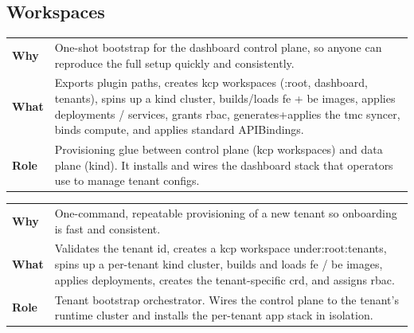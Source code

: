 \documentclass[11pt, a4paper, oneside, listof=totoc]{scrartcl}
\makeatletter
\newcommand{\codesummary}[3]{%
    \vspace{0.4\baselineskip}%
    \noindent\begin{tabularx}{\linewidth}{@{}>{\bfseries}l X@{}}
    Why  & #1\\
    What & #2\\
    Role & #3\\
    \end{tabularx}%
    \vspace{0.2\baselineskip}%
}
\makeatother
\begin{document}
        \clearpage

            \subsection{Workspaces}
                \codesummary
                    {One-shot bootstrap for the dashboard control plane, so anyone can reproduce the full setup quickly and consistently.}
                    {Exports plugin paths, creates \gls{kcp} workspaces (:root, dashboard, tenants), spins up a \gls{kind} cluster, builds/loads \gls{fe} + \gls{be} images, applies deployments / services, grants \gls{rbac}, generates+applies the \gls{tmc} syncer, binds compute, and applies standard APIBindings.}
                    {Provisioning glue between control plane (\gls{kcp} workspaces) and data plane (\gls{kind}). It installs and wires the dashboard stack that operators use to manage tenant configs.}

                \codesummary
                    {One-command, repeatable provisioning of a new tenant so onboarding is fast and consistent.}
                    {Validates the tenant id, creates a \gls{kcp} workspace under\@:root:tenants, spins up a per-tenant kind cluster, builds and loads \gls{fe} / \gls{be} images, applies deployments, creates the tenant-specific \gls{crd}, and assigns \gls{rbac}.}
                    {Tenant bootstrap orchestrator. Wires the control plane to the tenant's runtime cluster and installs the per-tenant app stack in isolation.}
\end{document}
